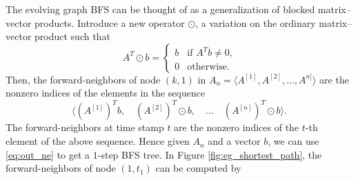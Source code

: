 \documentclass[11pt,conference,compsocconf]{IEEEtran}
\theoremstyle{definition}
\begin{document}
The evolving graph BFS can be thought of as a generalization of blocked
matrix--vector products.
Introduce a new operator $\odot$, a variation on the ordinary matrix--vector
product such that
\[
A^T \odot b =
\begin{cases}
b & \mbox{if $A^Tb \ne 0$,} \\
0 & \mbox{otherwise.}
\end{cases}
\]
Then, the forward-neighbors of node $(k, 1)$ in $A_n = \langle A^{[1]}, A^{[2]}, \ldots, A^{n]}\rangle$ are the nonzero indices of the
elements in the sequence
\begin{equation}
\label{eq:out_ne}
\big\langle (A^{[1]})^Tb, \quad  (A^{[2]})^T\odot b, \quad \ldots \quad (A^{[n]})^T\odot b \big\rangle.
\end{equation}
The forward-neighbors at time stamp $t$ are the nonzero indices of the $t$-th element of the above sequence.
Hence given $A_n$ and a vector $b$, we can use \eqref{eq:out_ne} to
get a $1$-step BFS tree. In Figure \ref{fig:eg_shortest_path}, the forward-neighbors
of node $(1, t_1)$ can be computed by
\end{document}
